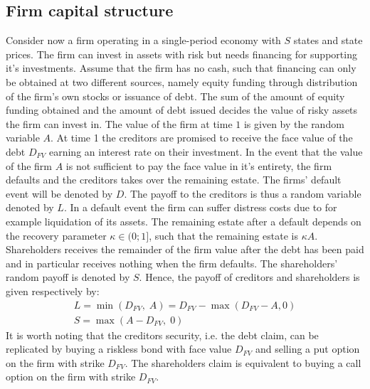\documentclass[main.tex]{subfiles}
\begin{document}
    \subsection{Firm capital structure}
        Consider now a firm operating in a single-period economy with $S$ states and state prices.
        The firm can invest in assets with risk but needs financing for supporting it's investments.
        Assume that the firm has no cash, such that financing can only be obtained at two different sources, namely equity funding through distribution of the firm's own stocks or issuance of debt.
        The sum of the amount of equity funding obtained and the amount of debt issued decides the value of risky assets the firm can invest in.
        The value of the firm at time $1$ is given by the random variable $A$.
        At time 1 the creditors are promised to receive the face value of the debt $D_{FV}$ earning an interest rate on their investment.
        In the event that the value of the firm $A$ is not sufficient to pay the face value in it's entirety, the firm defaults and the creditors takes over the remaining estate. 
        The firms' default event will be denoted by $D$.
        The payoff to the creditors is thus a random variable denoted by $L$.
        In a default event the firm can suffer distress costs due to for example liquidation of its assets.
        The remaining estate after a default depends on the recovery parameter $\kappa \in (0;1]$, such that the remaining estate is $\kappa A$.
        Shareholders receives the remainder of the firm value after the debt has been paid and in particular receives nothing when the firm defaults.
        The shareholders' random payoff is denoted by $S$.
        Hence, the payoff of creditors and shareholders is given respectively by:
            \begin{gather}
                L = \min\left(
                        D_{FV},\; A
                    \right)
                    = D_{FV} - \max\left(
                        D_{FV} - A, 0
                    \right) \label{eqn:legacy-creditor-payoff}\\
                S
                    = \max\left(
                        A - D_{FV},\; 0
                    \right)
            \end{gather}
        It is worth noting that the creditors security, i.e. the debt claim, can be replicated by buying a riskless bond with face value $D_{FV}$ and selling a put option on the firm with strike $D_{FV}$.
        The shareholders claim is equivalent to buying a call option on the firm with strike $D_{FV}$.
\end{document}
